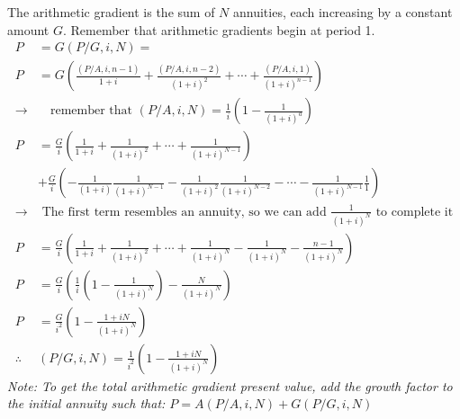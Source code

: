 \begin{definition}
    The arithmetic gradient is the sum of $N$ annuities, each increasing by a constant amount $G$. Remember that arithmetic gradients begin at period 1.
    \begin{align*}
        P           & = G(P/G, i, N) =                                                                                                                                                           \\
        P           & = G \left(\frac{(P/A, i, n-1)}{1 + i} + \frac{(P/A, i, n-2)}{(1 + i)^2} + \cdots + \frac{(P/A, i, 1)}{(1+i)^{n-1}}\right)                                                  \\
        \rightarrow & \quad \text{remember that } (P/A, i, N) = \frac{1}{i}\left(1 - \frac{1}{(1+i)^a}\right)                                                                                    \\
        P           & = \frac{G}{i} \left(
        \frac{1}{1+i} + \frac{1}{(1+i)^2} + \cdots + \frac{1}{(1+i)^{N-1}}
        \right)                                                                                                                                                                                  \\
                    & + \frac{G}{i} \left(
        - \frac{1}{(1+i)}\frac{1}{(1+i)^{N-1}} - \frac{1}{(1+i)^2}\frac{1}{(1+i)^{N-2}} - \cdots - \frac{1}{(1+i)^{N-1}}\frac{1}{1}
        \right)                                                                                                                                                                                  \\
        \rightarrow & \text{ The first term resembles an annuity, so we can add $\frac{1}{(1 + i)^N}$ to complete it}                                                                            \\
        P           & = \frac{G}{i}\left(                                    \frac{1}{1+i} + \frac{1}{(1+i)^2} + \cdots + \frac{1}{(1+i )^N} - \frac{1}{(1+i)^N} - \frac{n -1}{(1 + i)^N}\right)
        \\
        P           & = \frac{G}{i}\left(\frac{1}{i}(1 - \frac{1}{(1 + i)^N}) - \frac{N}{(1 + i)^N}\right)                                                                                       \\
        P           & = \frac{G}{i^2}\left(1 - \frac{1+iN}{(1 + i)^N}\right)                                                                                                                     \\
        \therefore  & \boxed{(P/G, i, N) = \frac{1}{i^2}\left(1 - \frac{1+iN}{(1 + i)^N}\right)}
    \end{align*}
    \textit{Note: To get the total arithmetic gradient present value, add the growth factor to the initial annuity such that: $P = A(P/A, i, N) + G(P/G, i, N)$}
\end{definition}

